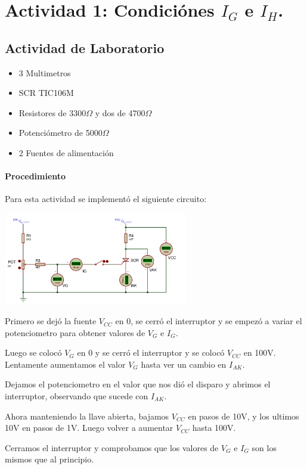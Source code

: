\section{Actividad 1: Condiciónes $I_G$ e $I_H$.}

\subsection{Actividad de Laboratorio}

\begin{itemize}
    \item 3 Multimetros
    \item SCR TIC106M
    \item Resistores de 3300$\Omega$ y dos de 4700$\Omega$
    \item Potenciómetro de 5000$\Omega$
    \item 2 Fuentes de alimentación
\end{itemize}

\paragraph{Procedimiento}
Para esta actividad se implementó el siguiente circuito:

\includegraphics[width=8.08cm]{./imagenes/Circ1.png}

Primero se dejó la fuente $V_{CC}$ en 0, se cerró el interruptor y se empezó a variar el potenciometro para obtener valores de $V_G$ e $I_G$.

Luego se colocó $V_G$ en 0 y se cerró el interruptor y se colocó $V_{CC}$ en 100V. Lentamente aumentamos el valor $V_G$ hasta ver un cambio en $I_{AK}$.

Dejamos el potenciometro en el valor que nos dió el disparo y abrimos el interruptor, observando que sucede con $I_{AK}$.

Ahora manteniendo la llave abierta, bajamos $V_{CC}$ en pasos de 10V, y los ultimos 10V en pasos de 1V. Luego volver a aumentar $V_{CC}$ hasta 100V.

Cerramos el interruptor y comprobamos que los valores de $V_G$ e $I_G$ son los mismos que al principio.

